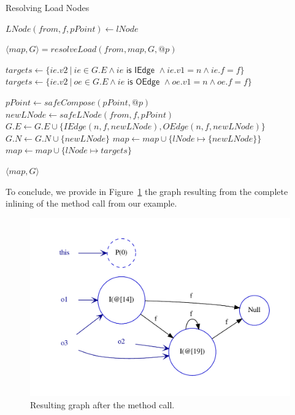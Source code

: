 \begin{algorithm}
\caption{Resolving Load Nodes}\label{algo:pt:resload}
\begin{algorithmic}[1]

    \State $LNode(from, f, pPoint) \gets lNode$

        \State $\langle map, G \rangle = resolveLoad(from, map, G, @p)$
    \EndIf

        \State $targets \gets \{ ie.v2 ~|~ ie \in G.E \land ie \textsf{ is IEdge } \land ie.v1 = n \land ie.f = f \}$
            \State $targets \gets \{ ie.v2 ~|~ oe \in G.E \land ie \textsf{ is OEdge } \land oe.v1 = n \land oe.f = f \}$
        \EndIf

            \State $pPoint \gets safeCompose(pPoint, @p)$
            \State $newLNode \gets safeLNode(from, f, pPoint)$
            \State $G.E \gets G.E \cup \{ IEdge(n, f, newLNode), OEdge(n, f, newLNode) \}$
            \State $G.N \gets G.N \cup \{ newLNode \}$
            \State $map \gets map \cup \{ lNode \mapsto \{ newLNode \} \}$
        \Else
            \State $map \gets map \cup \{ lNode \mapsto targets \}$
        \EndIf
    \EndFor

    \State \Return $\langle map, G \rangle$
\EndFunction
\end{algorithmic}
\end{algorithm}

To conclude, we provide in Figure~\ref{fig:pt:inline1result} the graph
resulting from the complete inlining of the method call from our example.
\begin{figure}
    \centering
    \includegraphics[scale=0.7]{images/pt_inline1result}
    \caption{Resulting graph after the method call.}
    \label{fig:pt:inline1result}
\end{figure}


